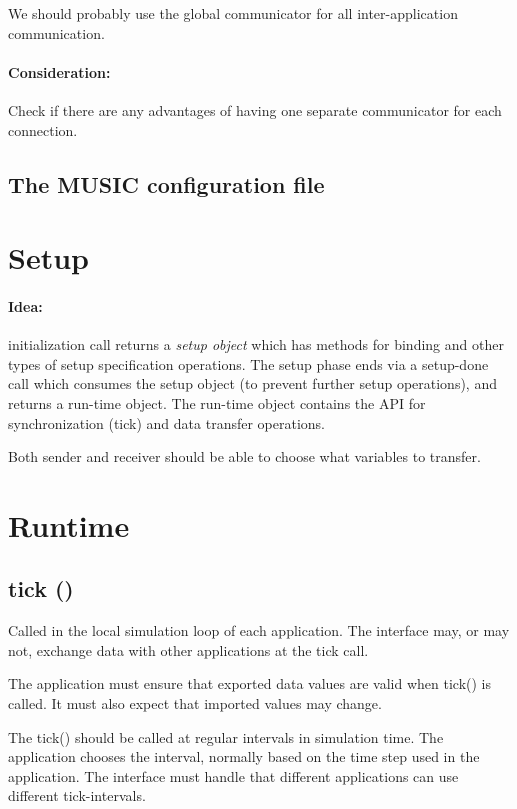 \documentclass[a4paper]{report}
\newenvironment{metatext}%
{\color{blue}}%
{}
\begin{document}
We should probably use the global communicator for all
inter-application communication.

\begin{metatext}
  \paragraph{Consideration:} Check if there are any advantages of having one
  separate communicator for each connection.
\end{metatext}

\subsection{The MUSIC configuration file}

\section{Setup}

\paragraph{Idea:} initialization call returns a \emph{setup object}
which has methods for binding and other types of setup specification
operations.  The setup phase ends via a setup-done call which consumes
the setup object (to prevent further setup operations), and returns a
run-time object.  The run-time object contains the API for
synchronization (tick) and data transfer operations.

Both sender and receiver should be able to choose what variables to
transfer.


\section{Runtime}

\subsection{tick ()}

Called in the local simulation loop of each application.
The interface may, or may not, exchange data with other applications
at the tick call.

The application must ensure that exported data values are valid when
tick() is called.  It must also expect that imported values may change.

The tick() should be called at regular intervals in simulation time.
The application chooses the interval, normally based on the time step
used in the application.  The interface must handle that different
applications can use different tick-intervals.
\end{document}
